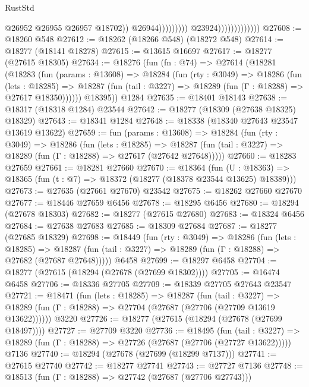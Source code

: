 \begin{lexlean}{RustStd}
\begin{coremodule}
                                                    @26952
                                                    @26955
                                                    @26957
                                                    @18702))
                                                @26944)))))))))
                              @23924)))))))))))))
@27608 := @18260 @548
@27612 := @18262 (@18266 @548) (@18272 @548)
@27614 := @18277 (@18141 @18278)
@27615 := @13615 @16697
@27617 := @18277 (@27615 @18305)
@27634 := @18276
    (fun (fn : @74) =>
    @27614
      (@18281
        (@18283
          (fun (params : @13608) =>
          @18284
            (fun (rty : @3049) =>
            @18286
              (fun (lets : @18285) =>
              @18287 (fun (tail : @3227) => @18289 (fun (Γ : @18288) => @27617 @18350))))))
        @18395))
    @1284
@27635 := @18401 @18143
@27638 := @18317 (@18318 @1284) @23544
@27642 := @18277 (@18309 (@27638 @18325) @18329)
@27643 := @18341 @1284
@27648 := @18338 (@18340 @27643 @23547 @13619 @13622)
@27659 := fun (params : @13608) =>
  @18284
    (fun (rty : @3049) =>
    @18286
      (fun (lets : @18285) =>
      @18287 (fun (tail : @3227) => @18289 (fun (Γ : @18288) => @27617 (@27642 @27648)))))
@27660 := @18283 @27659
@27661 := @18281 @27660
@27670 := @18364
    (fun (U : @18363) => @18365 (fun (t : @7) => @18372 (@18277 (@18378 @23544 @13625) @18389)))
@27673 := @27635 (@27661 @27670) @23542
@27675 := @18262 @27660 @27670
@27677 := @18446 @27659 @6456
@27678 := @18295 @6456
@27680 := @18294 (@27678 @18303)
@27682 := @18277 (@27615 @27680)
@27683 := @18324 @6456
@27684 := @27638 @27683
@27685 := @18309 @27684
@27687 := @18277 (@27685 @18329)
@27698 := @18449
    (fun (rty : @3049) =>
    @18286
      (fun (lets : @18285) =>
      @18287 (fun (tail : @3227) => @18289 (fun (Γ : @18288) => @27682 (@27687 @27648)))))
    @6458
@27699 := @18297 @6458
@27704 := @18277 (@27615 (@18294 (@27678 (@27699 @18302))))
@27705 := @16474 @6458
@27706 := @18336 @27705
@27709 := @18339 @27705 @27643 @23547
@27721 := @18471
    (fun (lets : @18285) =>
    @18287
      (fun (tail : @3227) =>
      @18289 (fun (Γ : @18288) => @27704 (@27687 (@27706 (@27709 @13619 @13622))))))
    @3220
@27726 := @18277 (@27615 (@18294 (@27678 (@27699 @18497))))
@27727 := @27709 @3220
@27736 := @18495
    (fun (tail : @3227) => @18289 (fun (Γ : @18288) => @27726 (@27687 (@27706 (@27727 @13622)))))
    @7136
@27740 := @18294 (@27678 (@27699 (@18299 @7137)))
@27741 := @27615 @27740
@27742 := @18277 @27741
@27743 := @27727 @7136
@27748 := @18513 (fun (Γ : @18288) => @27742 (@27687 (@27706 @27743)))

\end{coremodule}
\end{lexlean}
